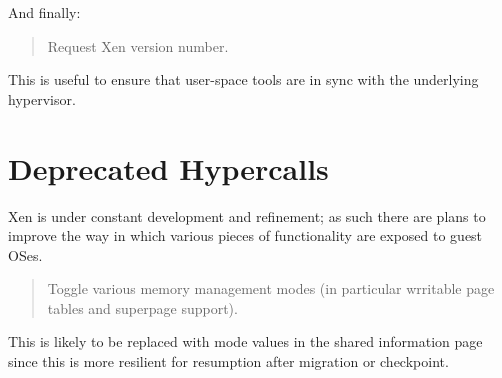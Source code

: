 \documentclass[11pt,twoside,final,openright]{xenstyle}
\begin{document}
And finally: 
\begin{quote}

Request Xen version number.
\end{quote} 

This is useful to ensure that user-space tools are in sync 
with the underlying hypervisor. 

\section{Deprecated Hypercalls}

Xen is under constant development and refinement; as such there 
are plans to improve the way in which various pieces of functionality 
are exposed to guest OSes. 

\begin{quote} 

Toggle various memory management modes (in particular wrritable page
tables and superpage support). 

\end{quote} 

This is likely to be replaced with mode values in the shared 
information page since this is more resilient for resumption 
after migration or checkpoint. 








\end{document}
